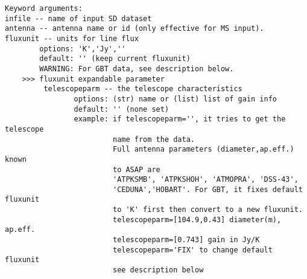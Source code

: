 \begin{verbatim}
Keyword arguments:
infile -- name of input SD dataset
antenna -- antenna name or id (only effective for MS input). 
fluxunit -- units for line flux
        options: 'K','Jy',''
        default: '' (keep current fluxunit)
        WARNING: For GBT data, see description below.
    >>> fluxunit expandable parameter
         telescopeparm -- the telescope characteristics
                options: (str) name or (list) list of gain info
                default: '' (none set)
                example: if telescopeparm='', it tries to get the telescope
                         name from the data.
                         Full antenna parameters (diameter,ap.eff.) known
                         to ASAP are
                         'ATPKSMB', 'ATPKSHOH', 'ATMOPRA', 'DSS-43',
                         'CEDUNA','HOBART'. For GBT, it fixes default fluxunit
                         to 'K' first then convert to a new fluxunit.
                         telescopeparm=[104.9,0.43] diameter(m), ap.eff.
                         telescopeparm=[0.743] gain in Jy/K
                         telescopeparm='FIX' to change default fluxunit
                         see description below


\end{verbatim}
